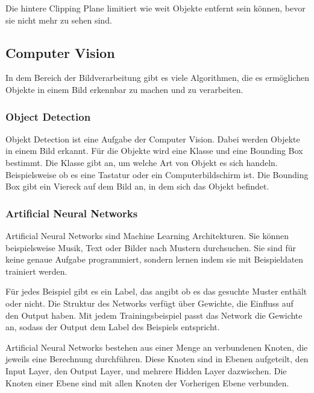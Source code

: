 Die hintere Clipping Plane limitiert wie weit Objekte entfernt sein können, bevor sie nicht mehr zu sehen sind.


\subsection{Computer Vision}
In dem Bereich der Bildverarbeitung gibt es viele Algorithmen, die es ermöglichen Objekte in einem Bild erkennbar zu machen und zu verarbeiten.

\subsubsection{Object Detection}
Objekt Detection ist eine Aufgabe der Computer Vision. Dabei werden Objekte in einem Bild erkannt. 
Für die Objekte wird eine Klasse und eine Bounding Box bestimmt. 
Die Klasse gibt an, um welche Art von Objekt es sich handeln. Beispielsweise ob es eine Tastatur oder ein Computerbildschirm ist.
Die Bounding Box gibt ein Viereck auf dem Bild an, in dem sich das Objekt befindet.




\subsubsection{Artificial Neural Networks}
Artificial Neural Networks sind Machine Learning Architekturen. Sie können beispielsweise Musik, Text oder Bilder nach Mustern durchsuchen. Sie sind für keine genaue Aufgabe programmiert, sondern lernen indem sie mit Beispieldaten trainiert werden. 

Für jedes Beispiel gibt es ein Label, das angibt ob es das gesuchte Muster enthält oder nicht. Die Struktur des Networks verfügt über Gewichte, die Einfluss auf den Output haben. Mit jedem Trainingsbeispiel passt das Network die Gewichte an, sodass der Output dem Label des Beispiels entspricht.\citep{introToCNN,surveyOfDeepLearing}

Artificial Neural Networks bestehen aus einer Menge an verbundenen Knoten, die jeweils eine Berechnung durchführen. Diese Knoten sind in Ebenen aufgeteilt, den Input Layer, den Output Layer, und mehrere Hidden Layer dazwischen. Die Knoten einer Ebene sind mit allen Knoten der Vorherigen Ebene verbunden.\citep{introToCNN,surveyOfDeepLearing}

